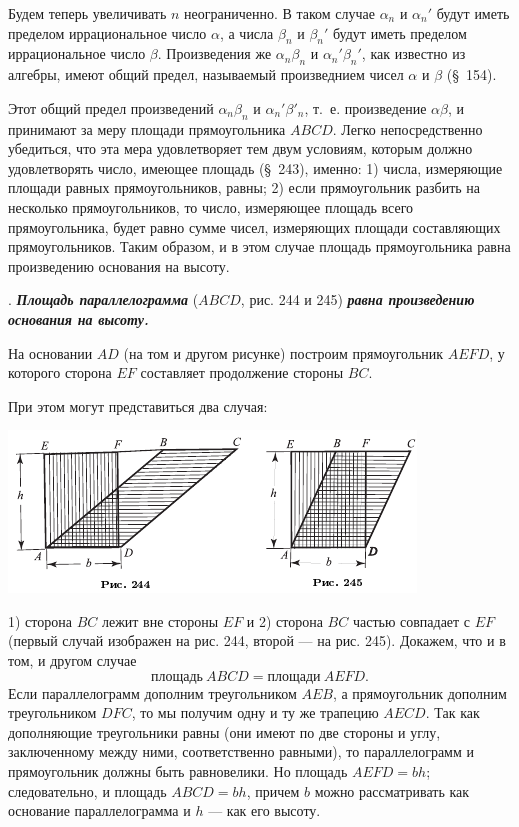\documentclass[oneside]{book}
\begin{document}
Будем теперь увеличивать $n$ неограниченно.
В таком случае $\alpha_n$ и $\alpha_n'$ будут иметь пределом иррациональное число $\alpha$, а числа $\beta_n$ и $\beta_n'$ будут иметь пределом иррациональное число $\beta$.
Произведения же $\alpha_n\beta_n$ и  $\alpha_n'\beta_n'$, как известно из алгебры, имеют общий предел, называемый произведнием чисел $\alpha$ и $\beta$ (§~154).

Этот общий предел произведений $\alpha_n$$\beta_n$ и  $\alpha_n' \beta'_n$, т.~е.
произведение $\alpha\beta$, и принимают за меру площади прямоугольника $ABCD$.
Легко непосредственно убедиться, что эта мера удовлетворяет тем двум условиям, которым должно удовлетворять число, имеющее площадь (§~243), именно:
1) числа, измеряющие площади равных прямоугольников, равны;
2) если прямоугольник разбить на несколько прямоугольников, то число, измеряющее площадь всего прямоугольника, будет равно сумме чисел, измеряющих площади составляющих прямоугольников.
Таким образом, и в этом случае площадь прямоугольника равна произведению основания на высоту.

.
\textbf{\emph{Площадь параллелограмма}} ($ABCD$, рис. 244 и 245) \textbf{\emph{равна произведению основания на высоту.}}

На основании $AD$ (на том и другом рисунке) построим прямоугольник $AEFD$, у которого сторона $EF$ составляет продолжение стороны $BC$.

При этом могут представиться два случая:

\includegraphics{pics/ris-244-245}

1) сторона $BC$ лежит вне стороны $EF$ и 2) сторона $BC$ частью совпадает с $EF$ (первый случай изображен на рис. 244, второй — на рис. 245).
Докажем, что и в том, и другом случае
\[\text{площадь}~ABCD = \text{площади}~AEFD.\]
Если параллелограмм дополним треугольником $AEB$, а прямоугольник дополним треугольником $DFC$, то мы получим одну и ту же трапецию $AECD$.
Так как дополняющие треугольники равны (они имеют по две стороны и углу, заключенному между ними, соответственно равными), то параллелограмм и прямоугольник должны быть равновелики.
Но площадь $AEFD=bh$;
следовательно, и площадь $ABCD=bh$, причем $b$ можно рассматривать как основание параллелограмма и $h$ — как его высоту.
\end{document}
